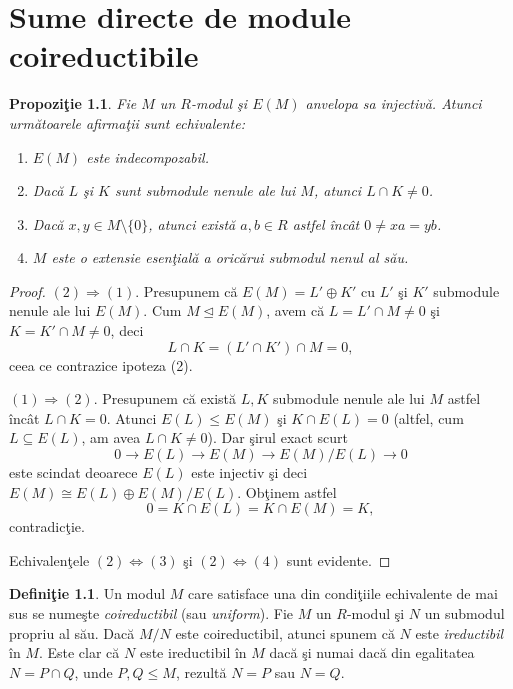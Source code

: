\documentclass[12pt,a4paper]{book}
\newcommand{\ess}{\trianglelefteq}  %
\theoremstyle{plain}
\newtheorem{proposition}[theorem]{Propoziţie}
\theoremstyle{definition}
\newtheorem{definition}[theorem]{Definiţie}
\theoremstyle{remark}
\begin{document}
\chapter{Sume directe de module coireductibile}

\begin{proposition}
Fie \(M\) un \(R\)-modul şi \(E(M)\) anvelopa sa injectivă. Atunci următoarele
afirmaţii sunt echivalente:
\begin{enumerate}
  \item \(E(M)\) este indecompozabil.
  \item Dacă \(L\) şi \(K\) sunt submodule nenule ale lui \(M\), atunci
        \(L \cap K \neq 0\).
  \item Dacă \(x,y \in M\setminus\{0\}\), atunci există \(a,b \in R\) astfel
        încât \(0 \neq xa = yb\).
  \item \(M\) este o extensie esenţială a oricărui submodul nenul al său.
\end{enumerate}
\end{proposition}

\begin{proof}
\((2) \Rightarrow (1)\).
Presupunem că \(E(M) = L' \oplus K'\) cu \(L'\) şi \(K'\) submodule nenule ale
lui \(E(M)\).
Cum \(M \ess E(M)\), avem că \(L = L' \cap M \neq 0\) şi
\(K = K' \cap M \neq 0\), deci
\[
L \cap K = (L' \cap K') \cap M = 0,
\]
ceea ce contrazice ipoteza (2).

\smallskip
\((1) \Rightarrow (2)\).
Presupunem că există \(L,K\) submodule nenule ale lui \(M\) astfel încât
\(L \cap K = 0\).
Atunci \(E(L) \leq E(M)\) şi \(K \cap E(L) = 0\) (altfel, cum
\(L \subseteq E(L)\), am avea \(L \cap K \neq 0\)).
Dar şirul exact scurt
\[
0 \longrightarrow E(L) \longrightarrow E(M) \longrightarrow E(M)/E(L)
\longrightarrow 0
\]
este scindat deoarece \(E(L)\) este injectiv şi deci
\(E(M) \cong E(L) \oplus E(M)/E(L)\).
Obţinem astfel
\[
0 = K \cap E(L) = K \cap E(M) = K,
\]
contradicţie.

Echivalenţele \((2) \Leftrightarrow (3)\) şi \((2) \Leftrightarrow (4)\) sunt
evidente.
\end{proof}

\begin{definition}
Un modul \(M\) care satisface una din condiţiile echivalente de mai sus se
numeşte \emph{coireductibil} (sau \emph{uniform}).
Fie \(M\) un \(R\)-modul şi \(N\) un submodul propriu al său.
Dacă \(M/N\) este coireductibil, atunci spunem că \(N\) este
\emph{ireductibil} în \(M\).
Este clar că \(N\) este ireductibil în \(M\) dacă şi numai dacă din egalitatea
\(N = P \cap Q\), unde \(P,Q \le M\), rezultă \(N = P\) sau \(N = Q\).
\end{definition}
\end{document}
